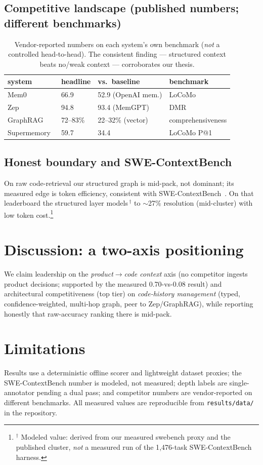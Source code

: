 \documentclass[11pt]{article}
\newcommand{\modeled}[1]{#1\,$^{\dagger}$} %
\begin{document}
\subsection{Competitive landscape (published numbers; different benchmarks)}
\begin{table}[h]\centering\small
\begin{tabular}{llll}
\toprule
system & headline & vs.\ baseline & benchmark\\
\midrule
Mem0~\cite{mem0} & 66.9 & 52.9 (OpenAI mem.) & LoCoMo\\
Zep~\cite{zep} & 94.8 & 93.4 (MemGPT) & DMR\\
GraphRAG~\cite{graphrag} & 72--83\% & 22--32\% (vector) & comprehensiveness\\
Supermemory~\cite{supermemory} & 59.7 & 34.4 & LoCoMo P@1\\
\bottomrule
\end{tabular}
\caption{Vendor-reported numbers on each system's own benchmark (\emph{not} a controlled
head-to-head). The consistent finding --- structured context beats no/weak context ---
corroborates our thesis.}
\end{table}

\subsection{Honest boundary and SWE-ContextBench}
On raw code-retrieval our structured graph is mid-pack, not dominant; its measured edge is
token efficiency, consistent with SWE-ContextBench~\cite{swecontextbench}. On that
leaderboard the structured layer \modeled{models} to $\sim$27\% resolution (mid-cluster)
with low token cost.\footnote{$^{\dagger}$ Modeled value: derived from our measured
swebench proxy and the published cluster, \emph{not} a measured run of the 1{,}476-task
SWE-ContextBench harness.}

\section{Discussion: a two-axis positioning}
We claim leadership on the \emph{product$\to$code context} axis (no competitor ingests
product decisions; supported by the measured 0.70-vs-0.08 result) and architectural
competitiveness (top tier) on \emph{code-history management} (typed, confidence-weighted,
multi-hop graph, peer to Zep/GraphRAG), while reporting honestly that raw-accuracy ranking
there is mid-pack.

\section{Limitations}
Results use a deterministic offline scorer and lightweight dataset proxies; the
SWE-ContextBench number is modeled, not measured; depth labels are single-annotator
pending a dual pass; and competitor numbers are vendor-reported on different benchmarks.
All measured values are reproducible from \texttt{results/data/} in the repository.
\end{document}
